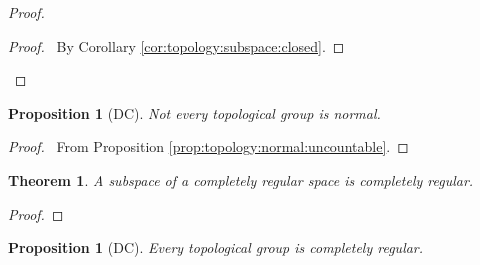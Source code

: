 \documentclass{report}
\let\qed\relax
\newtheorem{prop}[lm]{Proposition}
\newtheorem{thm}[lm]{Theorem}
\theoremstyle{definition}
\begin{document}
  \begin{proof}
   \pf
   \begin{proof}
     \pf\ By Corollary \ref{cor:topology:subspace:closed}.
   \end{proof}
   \qed
  \end{proof}

  \begin{prop}[DC]
   Not every topological group is normal.
  \end{prop}

  \begin{proof}
   \pf\ From Proposition \ref{prop:topology:normal:uncountable}. \qed
  \end{proof}

  \begin{thm}
   A subspace of a completely regular space is completely regular.
  \end{thm}

  \begin{proof}
   \pf
   \qed
 \end{proof}

 \begin{prop}[DC]
  Every topological group is completely regular.
 \end{prop}
\end{document}
